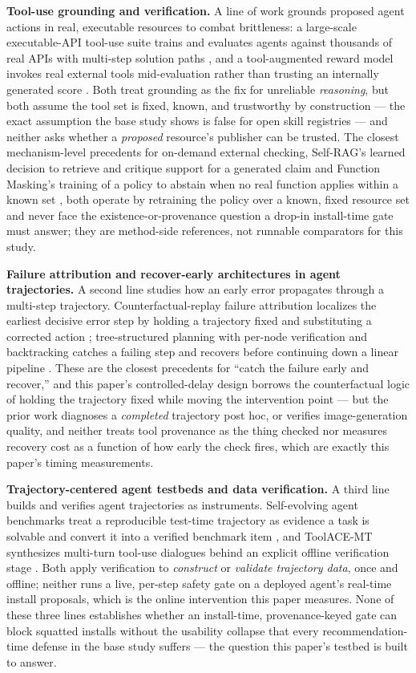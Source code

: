 \documentclass[11pt]{article}
\begin{document}
\textbf{Tool-use grounding and verification.} A line of work grounds proposed agent actions in real, executable resources to combat brittleness: a large-scale executable-API tool-use suite trains and evaluates agents against thousands of real APIs with multi-step solution paths \citep{toolllm}, and a tool-augmented reward model invokes real external tools mid-evaluation rather than trusting an internally generated score \citep{themis}. Both treat grounding as the fix for unreliable \emph{reasoning}, but both assume the tool set is fixed, known, and trustworthy by construction --- the exact assumption the base study shows is false for open skill registries --- and neither asks whether a \emph{proposed} resource's publisher can be trusted. The closest mechanism-level precedents for on-demand external checking, Self-RAG's learned decision to retrieve and critique support for a generated claim \citep{selfrag} and Function Masking's training of a policy to abstain when no real function applies within a known set \citep{funcmasking}, both operate by retraining the policy over a known, fixed resource set and never face the existence-or-provenance question a drop-in install-time gate must answer; they are method-side references, not runnable comparators for this study.

\textbf{Failure attribution and recover-early architectures in agent trajectories.} A second line studies how an early error propagates through a multi-step trajectory. Counterfactual-replay failure attribution localizes the earliest decisive error step by holding a trajectory fixed and substituting a corrected action \citep{agentracer}; tree-structured planning with per-node verification and backtracking catches a failing step and recovers before continuing down a linear pipeline \citep{genartist}. These are the closest precedents for ``catch the failure early and recover,'' and this paper's controlled-delay design borrows the counterfactual logic of holding the trajectory fixed while moving the intervention point --- but the prior work diagnoses a \emph{completed} trajectory post hoc, or verifies image-generation quality, and neither treats tool provenance as the thing checked nor measures recovery cost as a function of how early the check fires, which are exactly this paper's timing measurements.

\textbf{Trajectory-centered agent testbeds and data verification.} A third line builds and verifies agent trajectories as instruments. Self-evolving agent benchmarks treat a reproducible test-time trajectory as evidence a task is solvable and convert it into a verified benchmark item \citep{selfevolve}, and ToolACE-MT synthesizes multi-turn tool-use dialogues behind an explicit offline verification stage \citep{toolacemt}. Both apply verification to \emph{construct} or \emph{validate trajectory data}, once and offline; neither runs a live, per-step safety gate on a deployed agent's real-time install proposals, which is the online intervention this paper measures. None of these three lines establishes whether an install-time, provenance-keyed gate can block squatted installs without the usability collapse that every recommendation-time defense in the base study suffers --- the question this paper's testbed is built to answer.
\end{document}
